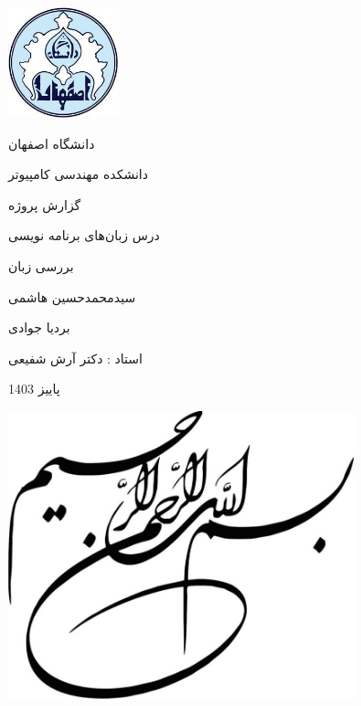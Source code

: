 \documentclass[11pt, a4paper, oneside]{book}
\begin{document}
	\begin{titlepage}
		\centering
		\includegraphics[width=3.2cm, height=3.2cm]{images/logo}\par
		\vspace{5mm}
		{\LARGE دانشگاه اصفهان}\par
		\vspace{5mm}
		{\Large دانشکده مهندسی کامپیوتر}\par
		
		\vspace{2cm}
		
		{\Large گزارش پروژه}\par
		
		\vspace{1cm}
		
		{\Large درس زبان‌های برنامه نویسی}\par
		
		\vspace{1cm}
		{\Huge بررسی زبان }\par
		
		
		\vspace{2cm}
		{\Large سیدمحمدحسین هاشمی}\par
		{\Large بردیا جوادی}\par
		\vspace{1cm}
		{\large استاد : دکتر آرش شفیعی}\par

		\vspace{2cm}
		
		{\large پاییز 1403\par}
	\end{titlepage}
	
	\clearpage
	\begin{center}
		\includegraphics[width=10cm]{images/image002}
	\end{center}  
	\thispagestyle{plain}\mbox{} 
	\clearpage
	
\end{document}
